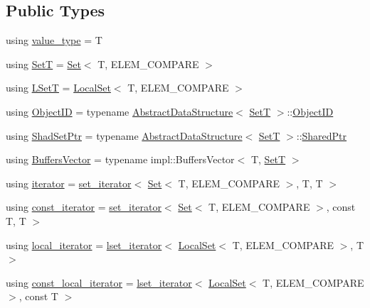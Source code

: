 \subsection*{Public Types}
\begin{DoxyCompactItemize}
\item 
using \hyperlink{classshad_1_1Set_a20c26f02edb7c6c978a0e0b6f2b46c80}{value\-\_\-type} = T
\item 
using \hyperlink{classshad_1_1Set_ac4975698d3f73a58bb223e28ca582fa9}{Set\-T} = \hyperlink{classshad_1_1Set}{Set}$<$ T, E\-L\-E\-M\-\_\-\-C\-O\-M\-P\-A\-R\-E $>$
\item 
using \hyperlink{classshad_1_1Set_a93ad50cc28bbc3b48f87e69bfbf3c632}{L\-Set\-T} = \hyperlink{classshad_1_1LocalSet}{Local\-Set}$<$ T, E\-L\-E\-M\-\_\-\-C\-O\-M\-P\-A\-R\-E $>$
\item 
using \hyperlink{classshad_1_1Set_a05ba25e24c892602d707b21e3e4300b9}{Object\-I\-D} = typename \hyperlink{classshad_1_1AbstractDataStructure}{Abstract\-Data\-Structure}$<$ \hyperlink{classshad_1_1Set_ac4975698d3f73a58bb223e28ca582fa9}{Set\-T} $>$\-::\hyperlink{classshad_1_1Set_a05ba25e24c892602d707b21e3e4300b9}{Object\-I\-D}
\item 
using \hyperlink{classshad_1_1Set_aa35015620563a346ef29432143fe1f44}{Shad\-Set\-Ptr} = typename \hyperlink{classshad_1_1AbstractDataStructure}{Abstract\-Data\-Structure}$<$ \hyperlink{classshad_1_1Set_ac4975698d3f73a58bb223e28ca582fa9}{Set\-T} $>$\-::\hyperlink{classshad_1_1AbstractDataStructure_a8bb29450966955c546d40421ce46316f}{Shared\-Ptr}
\item 
using \hyperlink{classshad_1_1Set_ace82796db9a7938647d935452ea6d39c}{Buffers\-Vector} = typename impl\-::\-Buffers\-Vector$<$ T, \hyperlink{classshad_1_1Set_ac4975698d3f73a58bb223e28ca582fa9}{Set\-T} $>$
\item 
using \hyperlink{classshad_1_1Set_a726ddfe3c1c55db2ef60c5c1960d6666}{iterator} = \hyperlink{classshad_1_1set__iterator}{set\-\_\-iterator}$<$ \hyperlink{classshad_1_1Set}{Set}$<$ T, E\-L\-E\-M\-\_\-\-C\-O\-M\-P\-A\-R\-E $>$, T, T $>$
\item 
using \hyperlink{classshad_1_1Set_a0b2608f92f5397a25e62fad925fc177e}{const\-\_\-iterator} = \hyperlink{classshad_1_1set__iterator}{set\-\_\-iterator}$<$ \hyperlink{classshad_1_1Set}{Set}$<$ T, E\-L\-E\-M\-\_\-\-C\-O\-M\-P\-A\-R\-E $>$, const T, T $>$
\item 
using \hyperlink{classshad_1_1Set_a12ce7d6fd8fd0569035b0eb236b22179}{local\-\_\-iterator} = \hyperlink{classshad_1_1lset__iterator}{lset\-\_\-iterator}$<$ \hyperlink{classshad_1_1LocalSet}{Local\-Set}$<$ T, E\-L\-E\-M\-\_\-\-C\-O\-M\-P\-A\-R\-E $>$, T $>$
\item 
using \hyperlink{classshad_1_1Set_a0857d9ce7a249e860e3a67bc18f7de8b}{const\-\_\-local\-\_\-iterator} = \hyperlink{classshad_1_1lset__iterator}{lset\-\_\-iterator}$<$ \hyperlink{classshad_1_1LocalSet}{Local\-Set}$<$ T, E\-L\-E\-M\-\_\-\-C\-O\-M\-P\-A\-R\-E $>$, const T $>$
\end{DoxyCompactItemize}
